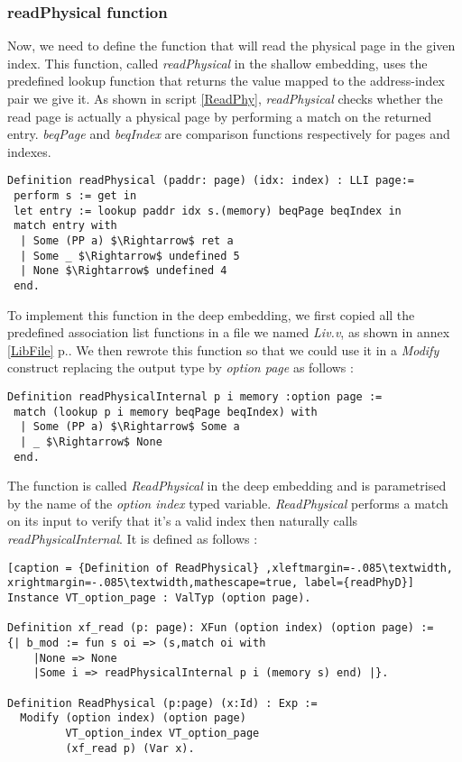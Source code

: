 \subsubsection{readPhysical function} 
Now, we need to define the function that will read the physical page in the given index. This function, called \textit{readPhysical} in the shallow embedding,  uses the predefined lookup function that returns the value mapped to the address-index pair we give it. As shown in script \ref{ReadPhy}, \textit{readPhysical} checks whether the read page is actually a physical page by performing a match on the returned entry. \textit{beqPage} and \textit{beqIndex} are comparison functions respectively for pages and indexes. 
\begin{lstlisting}[caption = {readPhysical function in the shallow embedding},xleftmargin=-.06\textwidth,
xrightmargin=-.06\textwidth ,label={ReadPhy},mathescape=true]
Definition readPhysical (paddr: page) (idx: index) : LLI page:=
 perform s := get in
 let entry := lookup paddr idx s.(memory) beqPage beqIndex in
 match entry with
  | Some (PP a) $\Rightarrow$ ret a
  | Some _ $\Rightarrow$ undefined 5
  | None $\Rightarrow$ undefined 4
 end.
\end{lstlisting} \pagebreak
To implement this function in the deep embedding, we first copied all the predefined association list functions in a file we named \textit{Liv.v}, as shown in annex \ref{LibFile} p.\pageref{LibFile}. We then rewrote this function so that we could use it in a \textit{Modify} construct replacing the output type by \textit{option page} as follows :
\begin{lstlisting}[caption = {Rewritten shallow readPhysical function},xleftmargin=-.02\textwidth,
xrightmargin=-.02\textwidth,mathescape=true]
Definition readPhysicalInternal p i memory :option page := 
 match (lookup p i memory beqPage beqIndex) with
  | Some (PP a) $\Rightarrow$ Some a
  | _ $\Rightarrow$ None
 end.
\end{lstlisting} \vspace{4pt}
The function is called \textit{ReadPhysical} in the deep embedding and is parametrised by the name of the \textit{option index} typed variable. \textit{ReadPhysical} performs a match on its input to verify that it's a valid index then naturally calls \textit{readPhysicalInternal}. It is defined as follows : 
\begin{lstlisting}[caption = {Definition of ReadPhysical} ,xleftmargin=-.085\textwidth,
xrightmargin=-.085\textwidth,mathescape=true, label={readPhyD}]
Instance VT_option_page : ValTyp (option page).

Definition xf_read (p: page): XFun (option index) (option page) := 
{| b_mod := fun s oi => (s,match oi with 
   	|None => None 
   	|Some i => readPhysicalInternal p i (memory s) end) |}.

Definition ReadPhysical (p:page) (x:Id) : Exp :=
  Modify (option index) (option page) 
         VT_option_index VT_option_page 
         (xf_read p) (Var x).
\end{lstlisting} \vspace{4pt}

